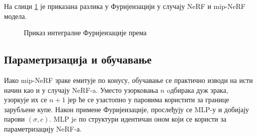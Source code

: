 \documentclass[12pt, a4paper, twoside]{book}
\numberwithin{equation}{chapter}
\numberwithin{theorem}{section}
\numberwithin{definition}{section}
\numberwithin{definitionChapter}{chapter}
\begin{document}
На слици \ref{fig-mipnerf-ipe} је приказана разлика у Фуријеизацији у случају NeRF и mip-NeRF модела.

\begin{figure}[H]
	\begin{center}
	\end{center}
	\caption{Приказ интегралне Фуријеизације према \cite{mip-nerf}}
	\label{fig-mipnerf-ipe}
\end{figure}

\subsection{Параметризација и обучавање}
Иако mip-NeRF зраке емитује по конусу, обучавање се практично изводи на исти начин као и у случају NeRF-a.
Уместо узорковања $n$ oдбирака дуж зрака, узоркује их се $n+1$ јер ће се узастопно у паровима користити
за границе зарубљене купе. Након примене Фуријеизације, прослеђују се MLP-у и добијају парови $(\sigma, c)$.
MLP je по структури идентичан оном који се користи за параметризацију NeRF-а.
\end{document}
